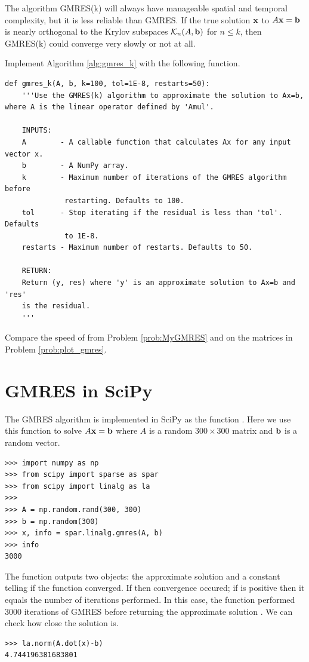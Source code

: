 The algorithm GMRES(k) will always have manageable spatial and temporal complexity, but it is less reliable than GMRES.
If the true solution ${\bf x}$ to $A{\bf x}={\bf b}$ is nearly orthogonal to the Krylov subspaces $\mathcal{K}_n(A, {\bf b})$ for $n\leq k$, then GMRES(k) could converge very slowly or not at all.

\begin{problem}
Implement Algorithm \ref{alg:gmres_k} with the following function.
\begin{lstlisting}
def gmres_k(A, b, k=100, tol=1E-8, restarts=50):
    '''Use the GMRES(k) algorithm to approximate the solution to Ax=b, where A is the linear operator defined by 'Amul'.
    
    INPUTS:
    A        - A callable function that calculates Ax for any input vector x.
    b        - A NumPy array.
    k        - Maximum number of iterations of the GMRES algorithm before 
              restarting. Defaults to 100.
    tol      - Stop iterating if the residual is less than 'tol'. Defaults 
              to 1E-8.
    restarts - Maximum number of restarts. Defaults to 50.
    
    RETURN:
    Return (y, res) where 'y' is an approximate solution to Ax=b and 'res' 
    is the residual.
    '''
\end{lstlisting}

Compare the speed of  from Problem \ref{prob:MyGMRES} and  on the matrices in Problem \ref{prob:plot_gmres}.
\label{prob:GMRES3}
\end{problem}

\section*{GMRES in SciPy}
The GMRES algorithm is implemented in SciPy as the function .
Here we use this function to solve $A{\bf x}={\bf b}$ where $A$ is a random $300 \times 300$ matrix and ${\bf b}$ is a random vector.

\begin{lstlisting}
>>> import numpy as np
>>> from scipy import sparse as spar
>>> from scipy import linalg as la
>>>
>>> A = np.random.rand(300, 300)
>>> b = np.random(300)
>>> x, info = spar.linalg.gmres(A, b)
>>> info
3000
\end{lstlisting}

The function outputs two objects: the approximate solution  and a constant  telling if the function converged.
If  then convergence occured; if  is positive then it equals the number of iterations performed.
In this case, the function performed 3000 iterations of GMRES before returning the approximate solution .
We can check how close the solution is.
\begin{lstlisting}
>>> la.norm(A.dot(x)-b)
4.744196381683801
\end{lstlisting}

